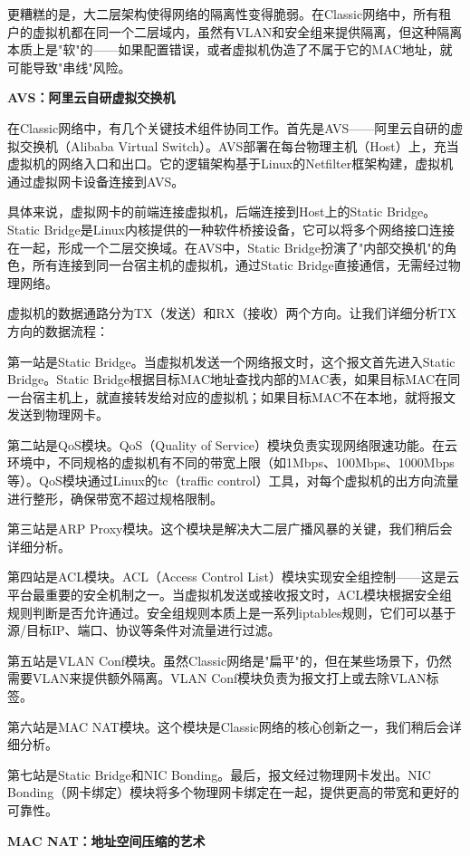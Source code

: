 更糟糕的是，大二层架构使得网络的隔离性变得脆弱。在Classic网络中，所有租户的虚拟机都在同一个二层域内，虽然有VLAN和安全组来提供隔离，但这种隔离本质上是"软"的——如果配置错误，或者虚拟机伪造了不属于它的MAC地址，就可能导致"串线"风险。

\textbf{AVS：阿里云自研虚拟交换机}

在Classic网络中，有几个关键技术组件协同工作。首先是AVS——阿里云自研的虚拟交换机（Alibaba Virtual Switch）。AVS部署在每台物理主机（Host）上，充当虚拟机的网络入口和出口。它的逻辑架构基于Linux的Netfilter框架构建，虚拟机通过虚拟网卡设备连接到AVS。

具体来说，虚拟网卡的前端连接虚拟机，后端连接到Host上的Static Bridge。Static Bridge是Linux内核提供的一种软件桥接设备，它可以将多个网络接口连接在一起，形成一个二层交换域。在AVS中，Static Bridge扮演了"内部交换机"的角色，所有连接到同一台宿主机的虚拟机，通过Static Bridge直接通信，无需经过物理网络。

虚拟机的数据通路分为TX（发送）和RX（接收）两个方向。让我们详细分析TX方向的数据流程：

第一站是Static Bridge。当虚拟机发送一个网络报文时，这个报文首先进入Static Bridge。Static Bridge根据目标MAC地址查找内部的MAC表，如果目标MAC在同一台宿主机上，就直接转发给对应的虚拟机；如果目标MAC不在本地，就将报文发送到物理网卡。

第二站是QoS模块。QoS（Quality of Service）模块负责实现网络限速功能。在云环境中，不同规格的虚拟机有不同的带宽上限（如1Mbps、100Mbps、1000Mbps等）。QoS模块通过Linux的tc（traffic control）工具，对每个虚拟机的出方向流量进行整形，确保带宽不超过规格限制。

第三站是ARP Proxy模块。这个模块是解决大二层广播风暴的关键，我们稍后会详细分析。

第四站是ACL模块。ACL（Access Control List）模块实现安全组控制——这是云平台最重要的安全机制之一。当虚拟机发送或接收报文时，ACL模块根据安全组规则判断是否允许通过。安全组规则本质上是一系列iptables规则，它们可以基于源/目标IP、端口、协议等条件对流量进行过滤。

第五站是VLAN Conf模块。虽然Classic网络是"扁平"的，但在某些场景下，仍然需要VLAN来提供额外隔离。VLAN Conf模块负责为报文打上或去除VLAN标签。

第六站是MAC NAT模块。这个模块是Classic网络的核心创新之一，我们稍后会详细分析。

第七站是Static Bridge和NIC Bonding。最后，报文经过物理网卡发出。NIC Bonding（网卡绑定）模块将多个物理网卡绑定在一起，提供更高的带宽和更好的可靠性。

\textbf{MAC NAT：地址空间压缩的艺术}

